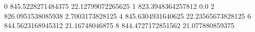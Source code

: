 0 845.5228271484375 22.12799072265625
1 823.3948364257812 0.0
2 826.0951538085938 2.7003173828125
4 845.6304931640625 22.23565673828125
6 844.5623168945312 21.16748046875
8 844.4727172851562 21.077880859375
